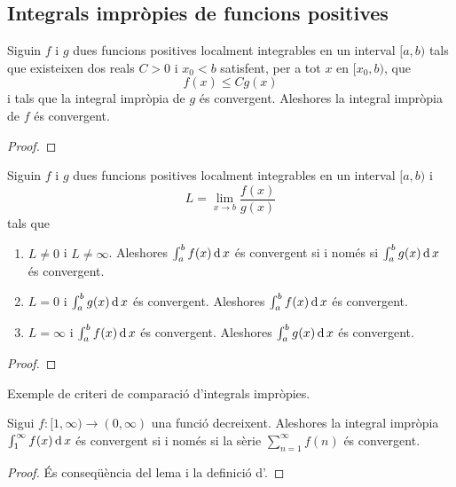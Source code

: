 \documentclass[../../Main.tex]{subfiles}
\begin{document}
	\subsection{Integrals impròpies de funcions positives}
	\begin{lemma}
		\label{lema:criteri de comparació d'integrals impròpies}
		Siguin \(f\) i \(g\) dues funcions positives localment integrables en un interval \([a,b)\) tals que existeixen dos reals \(C>0\) i \(x_{0}<b\) satisfent, per a tot \(x\) en \([x_{0},b)\), que
		\[f(x)\leq Cg(x)\]
		i tals que la integral impròpia de \(g\) és convergent. Aleshores la integral impròpia de \(f\) és convergent.
		\begin{proof}
		\end{proof}
	\end{lemma}
	\begin{theorem}
		\label{def:criteri de comapració d'integrals impròpies}
		Siguin \(f\) i \(g\) dues funcions positives localment integrables en un interval \([a,b)\) i
		\[L=\lim_{x\to b}\frac{f(x)}{g(x)}\]
		tals que
		\begin{enumerate}
			\item\label{def:criteri de comapració d'integrals impròpies:eq1} \(L\neq0\) i \(L\neq\infty\). Aleshores \(\int_{a}^{b}f(x)\operatorname{d} x\) és convergent si i només si \(\int_{a}^{b}g(x)\operatorname{d} x\) és convergent.
			\item\label{def:criteri de comapració d'integrals impròpies:eq2} \(L=0\) i \(\int_{a}^{b}g(x)\operatorname{d} x\) és convergent. Aleshores \(\int_{a}^{b}f(x)\operatorname{d} x\) és convergent.
			\item\label{def:criteri de comapració d'integrals impròpies:eq3} \(L=\infty\) i \(\int_{a}^{b}f(x)\operatorname{d} x\) és convergent. Aleshores \(\int_{a}^{b}g(x)\operatorname{d} x\) és convergent.
		\end{enumerate}
		\begin{proof}
		\end{proof}
	\end{theorem}
	\begin{example}
		\label{ex:criteri de comapració d'integrals impròpies}
		Exemple de criteri de comparació d'integrals impròpies. %
		\begin{solution}
		\end{solution}
	\end{example}
	\begin{theorem}
		\label{thm:criteri de la integral per integrals impròpies}
		Sigui \(f\colon[1,\infty)\longrightarrow(0,\infty)\) una funció decreixent. Aleshores la integral impròpia \(\int_{1}^{\infty}f(x)\operatorname{d} x\) és convergent si i només si la sèrie \(\sum_{n=1}^{\infty}f(n)\) és convergent.
		\begin{proof}
			És conseqüència del lema  i la definició d'.
		\end{proof}
	\end{theorem}
\end{document}
